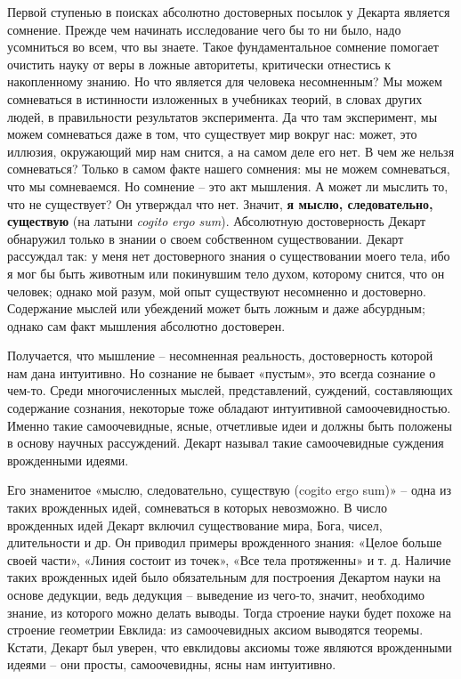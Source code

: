 \documentclass[a4paper, 14pt]{extreport}
\begin{document}
Первой ступенью в поисках абсолютно достоверных посылок у Декарта
является сомнение. Прежде чем начинать исследование чего бы то ни было,
надо усомниться во всем, что вы знаете. Такое фундаментальное сомнение
помогает очистить науку от веры в ложные авторитеты, критически
отнестись к накопленному знанию. Но что является для человека
несомненным? Мы можем сомневаться в истинности изложенных в учебниках
теорий, в словах других людей, в правильности результатов эксперимента.
Да что там эксперимент, мы можем сомневаться даже в том, что существует
мир вокруг нас: может, это иллюзия, окружающий мир нам снится, а на
самом деле его нет. В чем же нельзя сомневаться? Только в самом факте
нашего сомнения: мы не можем сомневаться, что мы сомневаемся. Но
сомнение -- это акт мышления. А может ли мыслить то, что не существует?
Он утверждал что нет. Значит, \textbf{я мыслю, следовательно, существую}
(на латыни \emph{cogito ergo sum}). Абсолютную достоверность Декарт
обнаружил только в знании о своем собственном существовании. Декарт
рассуждал так: у меня нет достоверного знания о существовании моего
тела, ибо я мог бы быть животным или покинувшим тело духом, которому
снится, что он человек; однако мой разум, мой опыт существуют несомненно
и достоверно. Содержание мыслей или убеждений может быть ложным и даже
абсурдным; однако сам факт мышления абсолютно достоверен.

Получается, что мышление -- несомненная реальность, достоверность
которой нам дана интуитивно. Но сознание не бывает «пустым», это всегда
сознание о чем-то. Среди многочисленных мыслей, представлений, суждений,
составляющих содержание сознания, некоторые тоже обладают интуитивной
самоочевидностью. Именно такие самоочевидные, ясные, отчетливые идеи и
должны быть положены в основу научных рассуждений. Декарт называл такие
самоочевидные суждения врожденными идеями.

Его знаменитое «мыслю, следовательно, существую (cogito ergo sum)» --
одна из таких врожденных идей, сомневаться в которых невозможно. В число
врожденных идей Декарт включил существование мира, Бога, чисел,
длительности и др. Он приводил примеры врожденного знания: «Целое больше
своей части», «Линия состоит из точек», «Все тела протяженны» и т. д.
Наличие таких врожденных идей было обязательным для построения Декартом
науки на основе дедукции, ведь дедукция -- выведение из чего-то, значит,
необходимо знание, из которого можно делать выводы. Тогда строение науки
будет похоже на строение геометрии Евклида: из самоочевидных аксиом
выводятся теоремы. Кстати, Декарт был уверен, что евклидовы аксиомы тоже
являются врожденными идеями -- они просты, самоочевидны, ясны нам
интуитивно.
\end{document}
